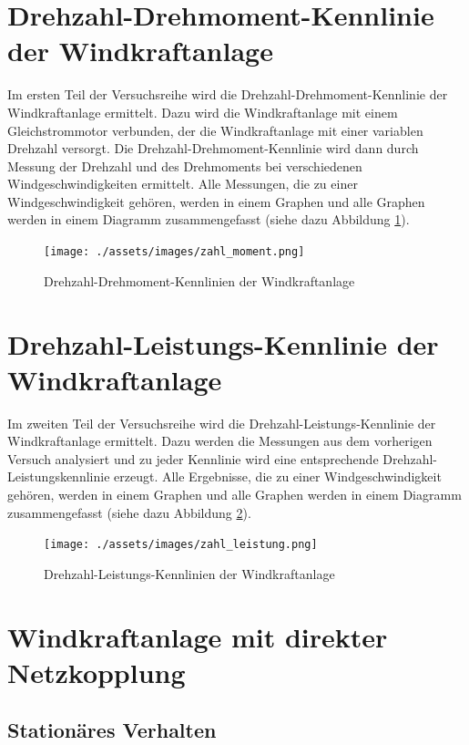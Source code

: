 \documentclass{report}
\begin{document}
\section{Drehzahl-Drehmoment-Kennlinie der Windkraftanlage}

Im ersten Teil der Versuchsreihe wird die Drehzahl-Drehmoment-Kennlinie der Windkraftanlage ermittelt. Dazu wird die Windkraftanlage mit einem Gleichstrommotor verbunden, der die Windkraftanlage mit einer variablen Drehzahl versorgt. Die Drehzahl-Drehmoment-Kennlinie wird dann durch Messung der Drehzahl und des Drehmoments bei verschiedenen Windgeschwindigkeiten ermittelt. Alle Messungen, die zu einer Windgeschwindigkeit gehören, werden in einem Graphen und alle Graphen werden in einem Diagramm zusammengefasst (siehe dazu Abbildung \ref{fig:zahl_moment}).

\begin{figure}[!ht]
	\centering
	\texttt{[image: ./assets/images/zahl\_moment.png]}
	\caption{Drehzahl-Drehmoment-Kennlinien der Windkraftanlage}
	\label{fig:zahl_moment}
\end{figure}

\section{Drehzahl-Leistungs-Kennlinie der Windkraftanlage}

Im zweiten Teil der Versuchsreihe wird die Drehzahl-Leistungs-Kennlinie der Windkraftanlage ermittelt. Dazu werden die Messungen aus dem vorherigen Versuch analysiert und zu jeder Kennlinie wird eine entsprechende Drehzahl-Leistungskennlinie erzeugt. Alle Ergebnisse, die zu einer Windgeschwindigkeit gehören, werden in einem Graphen und alle Graphen werden in einem Diagramm zusammengefasst (siehe dazu Abbildung \ref{fig:zahl_leistung}).

\begin{figure}[!ht]
	\centering
	\texttt{[image: ./assets/images/zahl\_leistung.png]}
	\caption{Drehzahl-Leistungs-Kennlinien der Windkraftanlage}
	\label{fig:zahl_leistung}
\end{figure}

\section{Windkraftanlage mit direkter Netzkopplung}

\subsection{Stationäres Verhalten}
\end{document}
